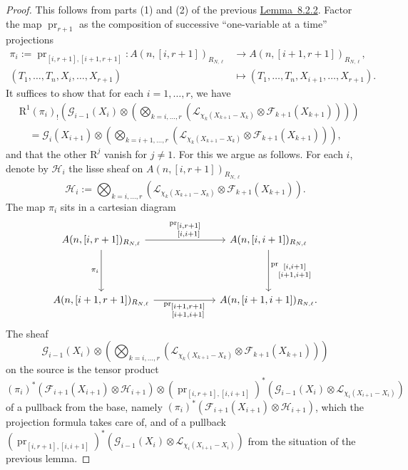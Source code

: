 \begin{proof}
This follows from parts (1) and (2) of the previous \hyperref[lem:8.2.2]{Lemma~8.2.2}. Factor the map \(\operatorname{pr}_{r+1}\) as the composition of successive ``one-variable at a time'' projections
\[
\begin{aligned}
\pi_i:=\operatorname{pr}_{[i,r+1],[i+1,r+1]}:A(n,[i,r+1])_{R_{N,\ell}}&\to A(n,[i+1,r+1])_{R_{N,\ell}},\\
(T_1,\ldots,T_n,X_i,\ldots,X_{r+1})&\mapsto(T_1,\ldots,T_n,X_{i+1},\ldots,X_{r+1}).
\end{aligned}
\]
It suffices to show that for each \(i=1,\ldots,r\), we have
\[
\begin{aligned}
&\mathrm{R}^1(\pi_i)_!\left(\mathcal{G}_{i-1}(X_i)\otimes\left(\bigotimes_{k=i,\ldots,r}(\mathcal{L}_{\chi_k(X_{k+1}-X_k)}\otimes\mathcal{F}_{k+1}(X_{k+1}))\right)\right)\\
&\quad=\mathcal{G}_i(X_{i+1})\otimes\left(\bigotimes_{k=i+1,\ldots,r}(\mathcal{L}_{\chi_k(X_{k+1}-X_k)}\otimes\mathcal{F}_{k+1}(X_{k+1}))\right),
\end{aligned}
\]
and that the other \(\mathrm{R}^j\) vanish for \(j\ne1\). For this we argue as follows. For each \(i\), denote by \(\mathcal{H}_i\) the lisse sheaf on \(A(n,[i,r+1])_{R_{N,\ell}}\)
\[
\mathcal{H}_i:=\bigotimes_{k=i,\ldots,r}(\mathcal{L}_{\chi_k(X_{k+1}-X_k)}\otimes\mathcal{F}_{k+1}(X_{k+1})).
\]
The map \(\pi_i\) sits in a cartesian diagram
\[
\begin{tikzcd}[column sep=6.2em,row sep=4.2em]
A(n,[i,r+1])_{R_{N,\ell}}
  \arrow[r,"{\scriptstyle\operatorname{pr}_{\substack{[i,r+1]\\ [i,i+1]}}}"]
  \arrow[d,"\pi_i"'] &
A(n,[i,i+1])_{R_{N,\ell}}
  \arrow[d,"{\scriptstyle\operatorname{pr}_{\substack{[i,i+1]\\ [i+1,i+1]}}}"]\\
A(n,[i+1,r+1])_{R_{N,\ell}}
  \arrow[r,"{\scriptstyle\operatorname{pr}_{\substack{[i+1,r+1]\\ [i+1,i+1]}}}"'] &
A(n,[i+1,i+1])_{R_{N,\ell}}.
\end{tikzcd}
\]
The sheaf
\[
\mathcal{G}_{i-1}(X_i)\otimes\left(\bigotimes_{k=i,\ldots,r}(\mathcal{L}_{\chi_k(X_{k+1}-X_k)}\otimes\mathcal{F}_{k+1}(X_{k+1}))\right)
\]
on the source is the tensor product
\[
(\pi_i)^*(\mathcal{F}_{i+1}(X_{i+1})\otimes\mathcal{H}_{i+1})\otimes(\operatorname{pr}_{[i,r+1],[i,i+1]})^*(\mathcal{G}_{i-1}(X_i)\otimes\mathcal{L}_{\chi_i(X_{i+1}-X_i)})
\]
of a pullback from the base, namely \((\pi_i)^*(\mathcal{F}_{i+1}(X_{i+1})\otimes\mathcal{H}_{i+1})\), which the projection formula takes care of, and of a pullback \((\operatorname{pr}_{[i,r+1],[i,i+1]})^*(\mathcal{G}_{i-1}(X_i)\otimes\mathcal{L}_{\chi_i(X_{i+1}-X_i)})\) from the situation of the previous lemma.
\end{proof}

